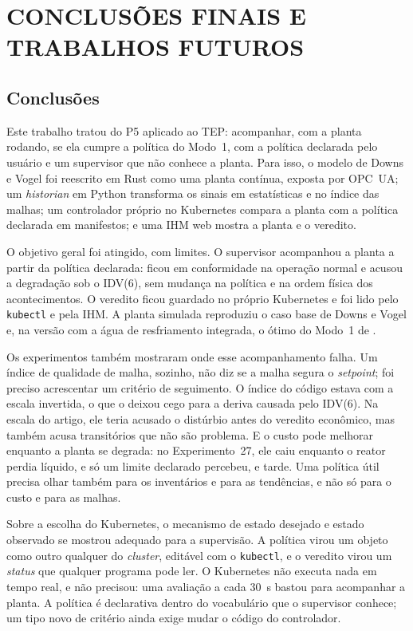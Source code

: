 \chapter[CONCLUSÕES FINAIS E TRABALHOS FUTUROS]{CONCLUSÕES FINAIS E TRABALHOS FUTUROS}
\label{cha:conclusao}

\section{Conclusões}
\label{sec:conclusoes}

Este trabalho tratou do P5 aplicado ao TEP: acompanhar, com a planta rodando, se ela cumpre a política do Modo~1, com a política declarada pelo usuário e um supervisor que não conhece a planta. Para isso, o modelo de Downs e Vogel foi reescrito em Rust como uma planta contínua, exposta por OPC~UA; um \textit{historian} em Python transforma os sinais em estatísticas e no índice das malhas; um controlador próprio no Kubernetes compara a planta com a política declarada em manifestos; e uma IHM web mostra a planta e o veredito.

O objetivo geral foi atingido, com limites. O supervisor acompanhou a planta a partir da política declarada: ficou em conformidade na operação normal e acusou a degradação sob o IDV(6), sem mudança na política e na ordem física dos acontecimentos. O veredito ficou guardado no próprio Kubernetes e foi lido pelo \texttt{kubectl} e pela IHM. A planta simulada reproduziu o caso base de Downs e Vogel e, na versão com a água de resfriamento integrada, o ótimo do Modo~1 de .

Os experimentos também mostraram onde esse acompanhamento falha. Um índice de qualidade de malha, sozinho, não diz se a malha segura o \textit{setpoint}; foi preciso acrescentar um critério de seguimento. O índice do código estava com a escala invertida, o que o deixou cego para a deriva causada pelo IDV(6). Na escala do artigo, ele teria acusado o distúrbio antes do veredito econômico, mas também acusa transitórios que não são problema. E o custo pode melhorar enquanto a planta se degrada: no Experimento~27, ele caiu enquanto o reator perdia líquido, e só um limite declarado percebeu, e tarde. Uma política útil precisa olhar também para os inventários e para as tendências, e não só para o custo e para as malhas.

Sobre a escolha do Kubernetes, o mecanismo de estado desejado e estado observado se mostrou adequado para a supervisão. A política virou um objeto como outro qualquer do \textit{cluster}, editável com o \texttt{kubectl}, e o veredito virou um \textit{status} que qualquer programa pode ler. O Kubernetes não executa nada em tempo real, e não precisou: uma avaliação a cada 30~s bastou para acompanhar a planta. A política é declarativa dentro do vocabulário que o supervisor conhece; um tipo novo de critério ainda exige mudar o código do controlador.

